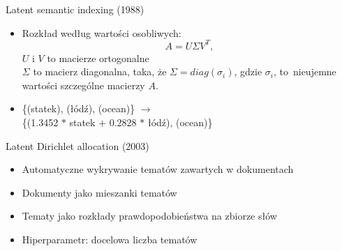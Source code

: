 \documentclass{beamer}
\begin{document}
	\begin{frame}{Latent semantic indexing (1988)}
		\begin{itemize}
			\setlength\itemsep{3em}
			\item Rozkład według wartości osobliwych:
				\begin{equation}
				\label{eq:svd}
				A = U \Sigma V^T,\!
				\end{equation}
				$U$ i $V$ to macierze ortogonalne\\
				$\Sigma$ to macierz diagonalna, taka, że $\Sigma = diag(\sigma_i)$, gdzie $\sigma_{i}$, to~nieujemne wartości szczególne macierzy $A$.\pause
			\item 
			\{(statek), (łódź), (ocean)\} $\to$ \\\{(1.3452 $*$ statek $+$ 0.2828 $*$ łódź), (ocean)\}
		\end{itemize}
	\end{frame}
	\begin{frame}{Latent Dirichlet allocation (2003)}
		\begin{itemize}
			\item Automatyczne wykrywanie tematów zawartych w dokumentach
			\item Dokumenty jako mieszanki tematów
			\item Tematy jako rozkłady prawdopodobieństwa na zbiorze słów
			\item Hiperparametr: docelowa liczba tematów
		\end{itemize}
	\end{frame}
\end{document}
